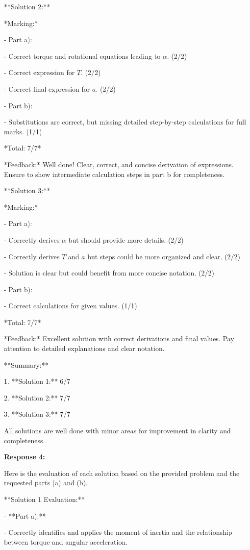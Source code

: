 \documentclass[a4paper,11pt]{article}
\begin{document}
**Solution 2:**

*Marking:*

- Part a):

  - Correct torque and rotational equations leading to \(\alpha\). (2/2)
  
  - Correct expression for \(T\). (2/2)
  
  - Correct final expression for \(a\). (2/2)
  
- Part b):

  - Substitutions are correct, but missing detailed step-by-step calculations for full marks. (1/1)

*Total: 7/7*

*Feedback:* Well done! Clear, correct, and concise derivation of expressions. Ensure to show intermediate calculation steps in part b for completeness.

**Solution 3:**

*Marking:*

- Part a):

  - Correctly derives \(\alpha\) but should provide more details. (2/2)
  
  - Correctly derives \(T\) and \(a\) but steps could be more organized and clear. (2/2)
  
  - Solution is clear but could benefit from more concise notation. (2/2)
  
- Part b):

  - Correct calculations for given values. (1/1)

*Total: 7/7*

*Feedback:* Excellent solution with correct derivations and final values. Pay attention to detailed explanations and clear notation.

**Summary:**

1. **Solution 1:** 6/7

2. **Solution 2:** 7/7

3. **Solution 3:** 7/7

All solutions are well done with minor areas for improvement in clarity and completeness.

\bigskip
\textbf{Response 4:}

Here is the evaluation of each solution based on the provided problem and the requested parts (a) and (b).

**Solution 1 Evaluation:**

- **Part a):**

  - Correctly identifies and applies the moment of inertia and the relationship between torque and angular acceleration.
  
\end{document}
